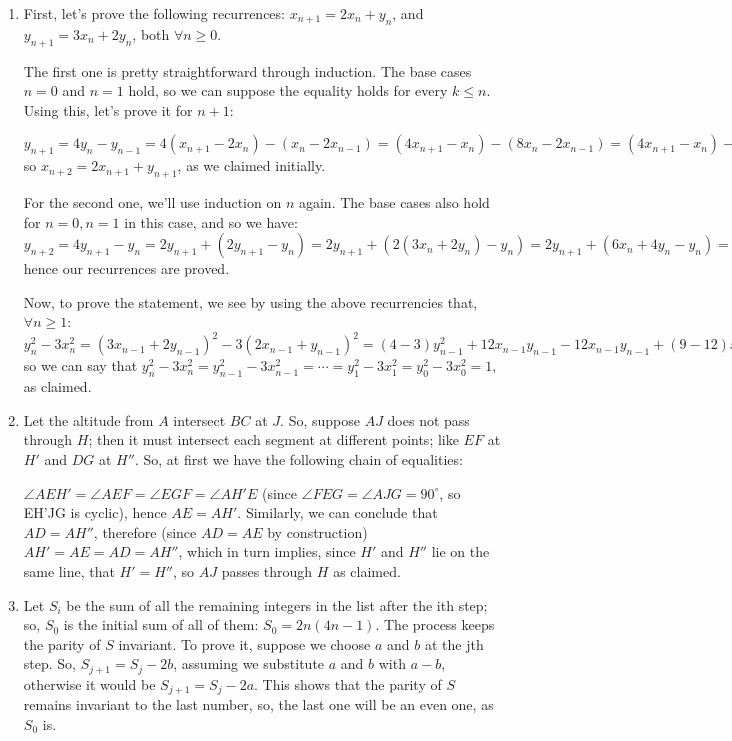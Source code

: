 \documentclass{article}
\begin{document}
\begin{enumerate}
\item
First, let's prove the following recurrences:
$x_{n + 1} = 2x_n + y_n$, and $y_{n + 1} = 3x_n + 2y_n$,
both $\forall n \geq 0$.

The first one is pretty straightforward through induction.
The base cases $n = 0$ and $n = 1$ hold, so we can suppose
the equality holds for every $k \leq n$. Using this, let's
prove it for $n + 1$:

$
    y_{n + 1} = 4y_n - y_{n - 1} = 
    4(x_{n + 1} - 2x_n) - (x_n - 2x_{n - 1}) =
    (4x_{n + 1} - x_n) - (8x_n - 2x_{n - 1}) =
    (4x_{n + 1} - x_n) - 2(4x_n - x_{n - 1}) =
    x_{n + 2} - 2x_{n + 1},
$
so $x_{n + 2} = 2x_{n + 1} + y_{n + 1}$, as we claimed
initially.

For the second one, we'll use induction on $n$ again. The
base cases also hold for $n = 0, n = 1$ in this case, and
so we have:
$
    y_{n + 2} = 4y_{n + 1} - y_n = 
    2y_{n + 1} + (2y_{n + 1} - y_n) =
    2y_{n + 1} + (2(3x_n + 2y_n) - y_n) =
    2y_{n + 1} + (6x_n + 4y_n - y_n) =
    2y_{n + 1} + 3(2x_n + y_n) =
    2y_{n + 1} + 3x_{n + 1},
$
hence our recurrences are proved.

Now, to prove the statement, we see by using the above
recurrencies that, $\forall n \geq 1$:
$
    y_n^2 - 3x_n^2 =
    (3x_{n - 1} + 2y_{n - 1})^2 - 3(2x_{n - 1} + y_{n - 1})^2 =
    (4 - 3)y_{n - 1}^2 + 12 x_{n - 1} y_{n - 1} -
    12 x_{n - 1} y_{n - 1} + (9 - 12)x_{n - 1}^2 =
    y_{n - 1}^2 - 3x_{n - 1}^2,
$
so we can say that
$
    y_n^2 - 3x_n^2 = y_{n - 1}^2 - 3x_{n - 1}^2 =
    \cdots = y_1^2 - 3x_1^2 = y_0^2 - 3x_0^2 = 1,
$
as claimed.

\item
Let the altitude from $A$ intersect $BC$ at $J$. So, suppose $AJ$ does not
pass through $H$; then it must intersect each segment at different points;
like $EF$ at $H'$ and $DG$ at $H''$. So, at first we have the following
chain of equalities:


$\angle AEH' = \angle AEF = \angle EGF = \angle AH'E$ (since $\angle FEG =
\angle AJG = 90^{\circ}$, so EH'JG is cyclic), hence $AE = AH'$. Similarly, we
can conclude that $AD = AH''$, therefore (since $AD = AE$ by construction)
$AH' = AE = AD = AH''$, which in turn implies, since $H'$ and $H''$ lie on
the same line, that $H' = H''$, so $AJ$ passes through $H$ as claimed.

\item
Let $S_i$ be the sum of all the remaining integers in the list after the ith
step; so, $S_0$ is the initial sum of all of them: $S_0 = 2n(4n - 1)$. The
process keeps the parity of $S$ invariant. To prove it, suppose we choose
$a$ and $b$ at the jth step. So, $S_{j + 1} = S_j - 2b$, assuming we
substitute $a$ and $b$ with $a - b$, otherwise it would be $S_{j + 1} = S_j
- 2a$. This shows that the parity of $S$ remains invariant to the last
number, so, the last one will be an even one, as $S_0$ is.
\end{enumerate}
\end{document}
